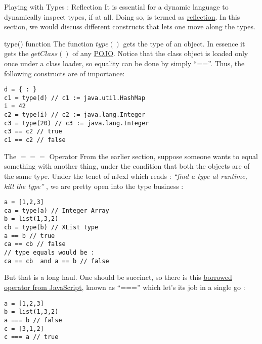 \begin{section}{Playing with Types : Reflection}
It is essential for a dynamic language to dynamically 
inspect types, if at all. Doing so, is termed as 
\href{https://en.wikipedia.org/wiki/Reflection\_(computer\_programming)}{reflection}.
In this section, we would discuss different constructs that lets one move along the types.


\begin{subsection}{type() function} 
The function $type()$ gets the type of an object.
In essence it gets the $getClass()$ of any 
\href{https://en.wikipedia.org/wiki/Plain\_Old\_Java\_Object}{POJO}.
Notice that the class object is loaded only once under a class loader,
so equality can be done by simply ``==''.
Thus, the following constructs are of importance:

\begin{lstlisting}[style=JexlStyle]
d = { : }
c1 = type(d) // c1 := java.util.HashMap
i = 42
c2 = type(i) // c2 := java.lang.Integer
c3 = type(20) // c3 := java.lang.Integer
c3 == c2 // true 
c1 == c2 // false 
\end{lstlisting}
\end{subsection}

\begin{subsection}{The $===$ Operator}
From the earlier section, suppose someone wants to 
equal something with another thing, under the condition
that both the objects are of the same type.
Under the tenet of nJexl which reads : \emph{ ``find a type at runtime, kill the type'' },
we are pretty open into the type business :

\begin{lstlisting}[style=JexlStyle]
a = [1,2,3] 
ca = type(a) // Integer Array 
b = list(1,3,2)
cb = type(b) // XList type 
a == b // true 
ca == cb // false 
// type equals would be :
ca == cb  and a == b // false  
\end{lstlisting}

But that is a long haul. One should be succinct,
so there is this \href{http://www.w3schools.com/js/js\_operators.asp}{borrowed operator from JavaScript},
known as ``==='' which let's its job in a single go :

\begin{lstlisting}[style=JexlStyle]
a = [1,2,3] 
b = list(1,3,2)
a === b // false 
c = [3,1,2]
c === a // true 
\end{lstlisting}
\end{subsection}


\end{section}
